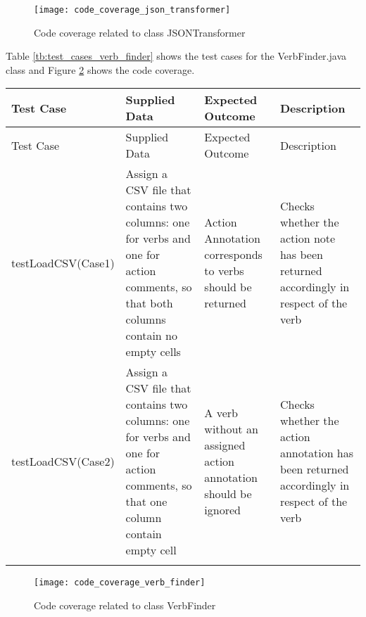 \begin{figure}[h]
	\centering
	\texttt{[image: code\_coverage\_json\_transformer]}
	\caption{Code coverage related to class JSONTransformer}\label{fig:code_coverage_json_transformer}
\end{figure} 


Table \ref{tb:test_cases_verb_finder} shows the test cases for the VerbFinder.java class and Figure \ref{fig:code_coverage_verb_finder} shows the code coverage.

	\thispagestyle{empty}
		\begingroup
		\centering
		\scriptsize
		\renewcommand{\arraystretch}{1,5} 
		\keepXColumns
		\begin{tabularx}{\textwidth}{X  X  X  X}		
			\hline
			Test Case &Supplied Data&Expected Outcome&Description\\
			\hline\hline
			\endfirsthead
			\hline
			Test Case &Supplied Data&Expected Outcome&Description\\
			\hline\hline
			\endhead
			testLoadCSV\linebreak (Case1)&Assign a CSV file that contains two columns: one for verbs and one for action comments, so that both columns contain no empty cells&Action Annotation corresponds to verbs should be returned&Checks whether the action note has been returned accordingly in respect of the verb\\
			
			testLoadCSV\linebreak (Case2)&Assign a CSV file that contains two columns: one for verbs and one for action comments, so that one column contain empty cell&A verb without an assigned action annotation should be ignored&Checks whether the action annotation has been returned accordingly in respect of the verb\\
			\hline
				\caption{Test cases for VerbFinder class}\label{tb:test_cases_verb_finder}
		\end{tabularx}		
		\endgroup

\begin{figure}[h]
	\centering
	\texttt{[image: code\_coverage\_verb\_finder]}
	\caption{Code coverage related to class VerbFinder}\label{fig:code_coverage_verb_finder}
\end{figure} 

